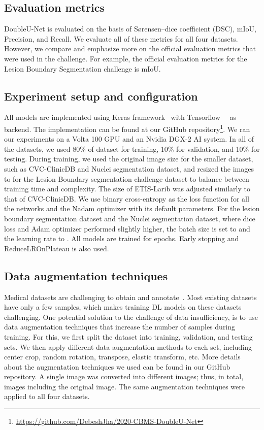 \documentclass[conference]{IEEEtran}
\begin{document}
\subsection{Evaluation metrics}
DoubleU-Net is evaluated on the basis of S{\o}rensen–dice coefficient (DSC), \acf{mIoU}, Precision, and Recall. We evaluate all of these metrics for all four datasets. However, we compare and emphasize more on the official evaluation metrics that were used in the challenge. For example, the official evaluation metrics for the Lesion Boundary Segmentation challenge is \ac{mIoU}. 


\subsection{Experiment setup and configuration}
All models are implemented using Keras framework~\cite{chollet2015keras} with Tensorflow~~\cite{abadi2016tensorflow} as backend. The implementation can be found at our GitHub repository\footnote{\url{https://github.com/DebeshJha/2020-CBMS-DoubleU-Net}}. We ran our experiments on a Volta 100 GPU and an Nvidia DGX-2 AI system. In all of the datasets, we used 80\% of dataset for training, 10\% for validation, and 10\% for testing. During training, we used the original image size for the smaller dataset, such as CVC-ClinicDB and Nuclei segmentation dataset, and resized the images to  for the Lesion Boundary segmentation challenge dataset to balance between training time and complexity. The size of ETIS-Larib was adjusted similarly to that of CVC-ClinicDB. We use binary cross-entropy as the loss function for all the networks and the Nadam optimizer with its default parameters. For the lesion boundary segmentation dataset and the Nuclei segmentation dataset, where dice loss and Adam optimizer performed slightly higher, the batch size is set to  and the learning rate to . All models are trained for  epochs. Early stopping and ReduceLROnPlateau is also used.  

\subsection{Data augmentation techniques}
Medical datasets are challenging to obtain and annotate~\cite{jha2020kvasir}. Most existing datasets have only a few samples, which makes  training \ac{DL} models on these datasets challenging. One potential solution to the challenge of data insufficiency, is to use data augmentation techniques that increase the number of samples during training. For this, we first split the dataset into training, validation, and testing sets. We then apply different data augmentation methods to each set, including center crop, random rotation, transpose, elastic transform, etc. More details about the augmentation techniques we used can be found in our GitHub repository. A single image was converted into  different images; thus, in total,  images including the original image.  The same augmentation techniques were applied to all four datasets. 
\end{document}
